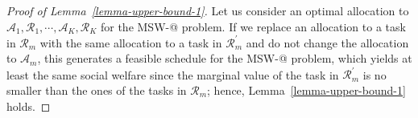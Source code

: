 \documentclass[10pt,journal,compsoc]{IEEEtran}
\makeatletter
\newcommand{\Rmnum}[1]{\expandafter\@slowromancap\romannumeral #1@}
\makeatother
\begin{document}
\begin{proof}[Proof of Lemma~\ref{lemma-upper-bound-1}]
 Let us consider an optimal allocation to $\mathcal{A}_1, \mathcal{R}_1, \cdots, \mathcal{A}_K, \mathcal{R}_{K}$ for the MSW-\Rmnum{1} problem. If we replace an allocation to a task in $\mathcal{R}_m$ with the same allocation to a task in $\mathcal{R}_{m}^{\prime}$ and do not change the allocation to $\mathcal{A}_m$, this generates a feasible schedule for the MSW-\Rmnum{2} problem, which yields at least the same social welfare since the marginal value of the task in $\mathcal{R}_{m}^{\prime}$ is no smaller than the ones of the tasks in $\mathcal{R}_m$; hence, Lemma~\ref{lemma-upper-bound-1} holds.
\end{proof}
\end{document}
